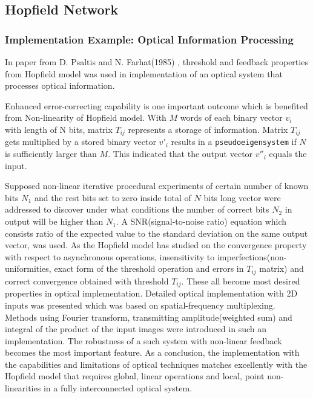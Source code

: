 \subsection{Hopfield Network}

\subsubsection{Implementation Example: Optical Information Processing}
In paper from D. Psaltis and N. Farhat(1985) \cite{optical_processing}, threshold and feedback properties from Hopfield model was used in implementation of an optical system that processes optical information.

Enhanced error-correcting capability is one important outcome which is benefited from Non-linearity of Hopfield model. With $M$ words of each binary vector $v_i$ with length of N bits, matrix $T_{ij}$ represents a storage of information. Matrix $T_{ij}$ gets multiplied by a stored binary vector $v'_i$ results in a \texttt{pseudoeigensystem} if $N$ is sufficiently larger than $M$. This indicated that the output vector $v''_i$ equals the input.

Supposed non-linear iterative procedural experiments of certain number of known bits $N_1$ and the rest bits set to zero inside total of $N$ bits long vector were addressed to discover under what conditions the number of correct bits $N_2$ in output will be higher than $N_1$. A SNR(signal-to-noise ratio) equation which consists ratio of the expected value to the standard deviation on the same output vector, was used. As the Hopfield model has studied on the convergence property with respect to asynchronous operations, insensitivity to imperfections(non-uniformities, exact form of the threshold operation and errors in $T_{ij}$ matrix) and correct convergence obtained with threshold $T_{ij}$. These all become most desired properties in optical implementation. Detailed optical implementation with 2D inputs was presented which was based on spatial-frequency multiplexing. Methods using Fourier transform, transmitting amplitude(weighted sum) and integral of the product of the input images were introduced in such an implementation. The robustness of a such system with non-linear feedback becomes the most important feature.
As a conclusion, the implementation with the capabilities and limitations of optical techniques matches excellently with the Hopfield model that requires global, linear operations and local, point non-linearities in a fully interconnected optical system.


